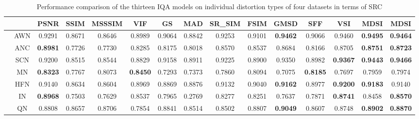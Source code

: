 \begin{table*}[htb]
\caption{Performance comparison of the thirteen IQA models on individual distortion types of four datasets in terms of SRC}
\scriptsize
\centering
\begin{tabular}{ccccccccccccccc}
\hline
                      &       & PSNR            & SSIM            & MSSSIM          & VIF             & GS              & MAD             & SR\_SIM         & FSIM           & GMSD            & SFF             & VSI             & MDSI             & MDSI                                \\ \hline
                      & AWN   & 0.9291          & 0.8671          & 0.8646          & 0.8989          & 0.9064          & 0.8842          & 0.9253          & 0.9101          & \textbf{0.9462} & 0.9066          & 0.9460 & \textbf{0.9495} & \textbf{0.9464}                     \\
                      & ANC   & \textbf{0.8981} & 0.7726          & 0.7730          & 0.8285          & 0.8175          & 0.8018          & 0.8570          & 0.8537          & 0.8684          & 0.8166          & 0.8705 & \textbf{0.8751} & \textbf{0.8723}                     \\
                      & SCN   & 0.9200          & 0.8515          & 0.8544          & 0.8829          & 0.9158          & 0.8911          & 0.9225          & 0.8900          & 0.9350 & 0.8982          & \textbf{0.9367} & \textbf{0.9443} & \textbf{0.9466}                     \\
                      & MN    & \textbf{0.8323} & 0.7767          & 0.8073          & \textbf{0.8450} & 0.7293          & 0.7373          & 0.7860          & 0.8094          & 0.7075          & \textbf{0.8185} & 0.7697          & 0.7959 & 0.7974                              \\
                      & HFN   & 0.9140          & 0.8634          & 0.8604          & 0.8969          & 0.8869          & 0.8876          & 0.9132          & 0.9040          & \textbf{0.9162} & 0.8977          & \textbf{0.9200} & \textbf{0.9183} & 0.9140                     \\
                      & IN    & \textbf{0.8968} & 0.7503          & 0.7629          & 0.8537 & 0.7965          & 0.2769          & 0.8277          & 0.8251          & 0.7637          & 0.7871          & \textbf{0.8741} & 0.8458 & \textbf{0.8570}                              \\
                      & QN    & 0.8808 & 0.8657          & 0.8706          & 0.7854          & 0.8841          & 0.8514          & 0.8502          & 0.8807          & \textbf{0.9049} & 0.8607          & 0.8748          & \textbf{0.8902} & \textbf{0.8870}                     \\

\end{tabular}
\end{table*}
